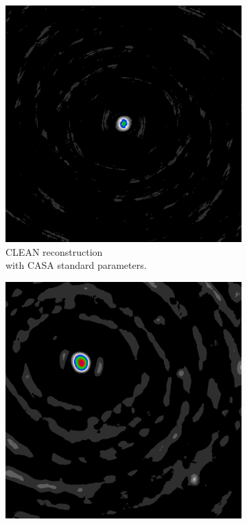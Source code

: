 \begin{figure}[h]
	\centering
	\begin{subfigure}[b]{0.3\linewidth}
		\includegraphics[width=\linewidth]{./chapters/01.intro/mk2/psf.png}
		\caption{CLEAN reconstruction \\with CASA standard parameters.}
		\label{results:points:tclean}
	\end{subfigure}
	\begin{subfigure}[b]{0.3\linewidth}
	\includegraphics[width=\linewidth]{./chapters/01.intro/mk2/dirty.png}

\end{subfigure}
\end{figure}
